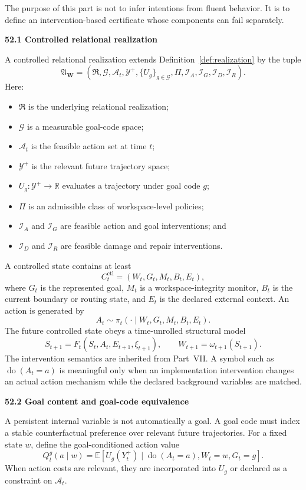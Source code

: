 \documentclass[11pt,letterpaper]{article}
\newcommand{\Workspace}{\mathbf W}
\newcommand{\subtopic}[1]{%
 \vspace{0.45em}
 {\bfseries\color{AccentColor} #1\par}
}
\theoremstyle{plain}
\theoremstyle{definition}
\begin{document}
The purpose of this part is not to infer intentions from fluent behavior. It
is to define an intervention-based certificate whose components can fail
separately.

\subtopic{52.1 Controlled relational realization}

A controlled relational realization extends Definition~\ref{def:realization}
by the tuple
\[
\boxed{
\mathfrak A_{\Workspace}
=
\left(
\mathfrak R,
\mathcal G,
\mathcal A_t,
\mathcal Y^+,
\{U_g\}_{g\in\mathcal G},
\Pi,
\mathcal I_A,
\mathcal I_G,
\mathcal I_D,
\mathcal I_R
\right).
}
\]
Here:
\begin{itemize}
\item \(\mathfrak R\) is the underlying relational realization;
\item \(\mathcal G\) is a measurable goal-code space;
\item \(\mathcal A_t\) is the feasible action set at time \(t\);
\item \(\mathcal Y^+\) is the relevant future trajectory space;
\item \(U_g:\mathcal Y^+\to\mathbb R\) evaluates a trajectory under goal
 code \(g\);
\item \(\Pi\) is an admissible class of workspace-level policies;
\item \(\mathcal I_A\) and \(\mathcal I_G\) are feasible action and goal
 interventions; and
\item \(\mathcal I_D\) and \(\mathcal I_R\) are feasible damage and repair
 interventions.
\end{itemize}

A controlled state contains at least
\[
C_t^{\mathrm{ctl}}
=
\left(
W_t,G_t,M_t,B_t,E_t
\right),
\]
where \(G_t\) is the represented goal, \(M_t\) is a workspace-integrity
monitor, \(B_t\) is the current boundary or routing state, and \(E_t\) is the
declared external context. An action is generated by
\[
A_t
\sim
\pi_t
\left(
\cdot\mid W_t,G_t,M_t,B_t,E_t
\right).
\]
The future controlled state obeys a time-unrolled structural model
\[
S_{t+1}
=
F_t(S_t,A_t,E_{t+1},\xi_{t+1}),
\qquad
W_{t+1}=\omega_{t+1}(S_{t+1}).
\]
The intervention semantics are inherited from Part~VII. A symbol such as
\(\operatorname{do}(A_t=a)\) is meaningful only when an implementation
intervention changes an actual action mechanism while the declared background
variables are matched.

\subtopic{52.2 Goal content and goal-code equivalence}

A persistent internal variable is not automatically a goal. A goal code must
index a stable counterfactual preference over relevant future trajectories.
For a fixed state \(w\), define the goal-conditioned action value
\[
Q_t^g(a\mid w)
=
\mathbb E
\left[
U_g(Y_t^+)
\mid
\operatorname{do}(A_t=a),
W_t=w,
G_t=g
\right].
\]
When action costs are relevant, they are incorporated into \(U_g\) or declared
as a constraint on \(\mathcal A_t\).
\end{document}
